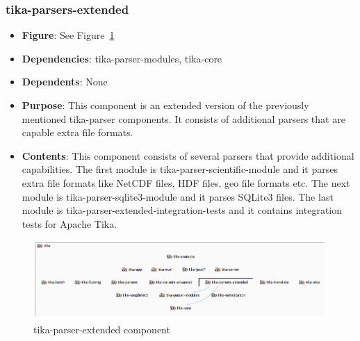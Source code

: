 \documentclass{article}
\begin{document}
\subsubsection{tika-parsers-extended}
\begin {itemize}
\item \textbf{Figure}: See Figure~\ref{fig:tika-parser-extended}
\item \textbf{Dependencies}: tika-parser-modules, tika-core
\item \textbf{Dependents}: None
\item \textbf{Purpose}: This component is an extended version of the previously mentioned tika-parser components. It consists of additional parsers that are capable extra file formats.
\item \textbf{Contents}: This component consists of several parsers that provide additional capabilities. The first module is tika-parser-scientific-module and it parses extra file formats like NetCDF files, HDF files, geo file formats etc. The next module is tika-parser-sqlite3-module and it parses SQLite3 files. The last module is tika-parser-extended-integration-tests and it contains integration tests for Apache Tika.
\end{itemize}
\begin{figure}[h!]
    \centering
    \includegraphics[width=1\textwidth]{report/images/tikaparserextended.PNG}
    \caption{tika-parser-extended component}
    \label{fig:tika-parser-extended}
\end{figure}
\end{document}
